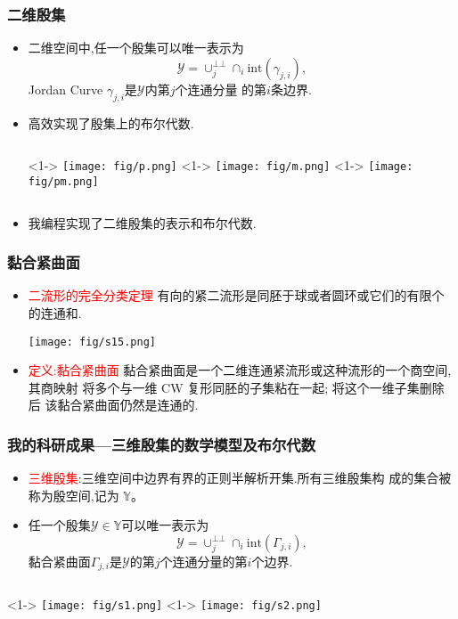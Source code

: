 \documentclass[UTF8]{ctexbeamer}	%
\theoremstyle{plain}
\theoremstyle{definition}
\theoremstyle{remark}
\numberwithin{equation}{section}
\begin{document}
\begin{frame}
    \frametitle{二维殷集}
    \begin{itemize}
        \item 二维空间中,任一个殷集可以唯一表示为
        \[\mathcal{Y} = \cup_j^{\bot \bot}\cap_i \text{int}(\gamma_{j, i} ),\]
        Jordan Curve $\gamma_{j, i}$是$\mathcal{Y}$内第$j$个连通分量
        的第$i$条边界.
        \item 高效实现了殷集上的布尔代数. 
        \begin{columns}
            <1->
                \texttt{[image: fig/p.png]}
            <1->
            \texttt{[image: fig/m.png]}
            <1->
            \texttt{[image: fig/pm.png]}
        \end{columns}
        \item 我编程实现了二维殷集的表示和布尔代数.
    \end{itemize}
\end{frame}

\begin{frame}
    \frametitle{黏合紧曲面}
    \begin{itemize}
        \item 
    \textcolor{red}{二流形的完全分类定理} \newline 
    有向的紧二流形是同胚于球或者圆环或它们的有限个的连通和.
    \begin{center}
        \texttt{[image: fig/s15.png]}
    \end{center}
    \item
    \textcolor{red}{定义:黏合紧曲面} \newline 
    黏合紧曲面是一个二维连通紧流形或这种流形的一个商空间, 其商映射
    将多个与一维 CW 复形同胚的子集粘在一起; 将这个一维子集删除后
    该黏合紧曲面仍然是连通的.
\end{itemize}
\end{frame}

\begin{frame}
    \frametitle{我的科研成果---三维殷集的数学模型及布尔代数}
    \begin{itemize}
        \item \textcolor{red}{三维殷集}:三维空间中边界有界的正则半解析开集.所有三维殷集构
        成的集合被称为殷空间,记为 $\mathbb{Y}$。
        \item 任一个殷集$\mathcal{Y} \in \mathbb{Y}$可以唯一表示为
        \[\mathcal{Y} = \cup_j^{\bot \bot} \cap_i \text{int}(\Gamma_{j, i}),\]
        黏合紧曲面$\Gamma_{j, i}$是$\mathcal{Y}$的第$j$个连通分量的第$i$个边界.
    \end{itemize}
    \begin{columns}
        <1->
            \texttt{[image: fig/s1.png]}
        <1->
        \texttt{[image: fig/s2.png]}
    \end{columns}
\end{frame}
\end{document}
